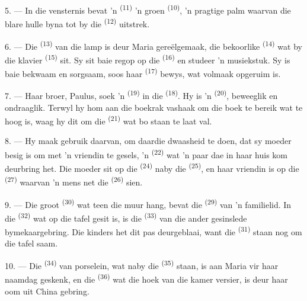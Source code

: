 5. --- In die vensternis bevat 'n  \textsuperscript{(11)} 'n groen
 \textsuperscript{(10)}, 'n pragtige palm waarvan die blare hulle byna tot
by die  \textsuperscript{(12)} uitstrek.

6. --- Die  \textsuperscript{(13)} van die lamp is deur Maria
gereëlgemaak, die bekoorlike  \textsuperscript{(14)} wat by die
klavier \textsuperscript{(15)} sit. Sy sit baie regop op die 
\textsuperscript{(16)} en studeer 'n musiekstuk. Sy is baie bekwaam en sorgsaam, soos
haar  \textsuperscript{(17)} bewys, wat volmaak opgeruim is.

\VUsaut{5.0mm}
\VUsaut{3.0mm}

7. --- Haar broer, Paulus, soek 'n  \textsuperscript{(19)} in die
 \textsuperscript{(18)}. Hy is 'n 
\textsuperscript{(20)}, beweeglik en ondraaglik. Terwyl hy hom aan die boekrak vashaak om
die boek te bereik wat te hoog is, waag hy dit om die 
\textsuperscript{(21)} wat bo staan te laat val.

8. --- Hy maak gebruik daarvan, om daardie dwaasheid te doen, dat sy moeder besig is om
met 'n vriendin te gesels, 'n  \textsuperscript{(22)} wat 'n paar dae in
haar huis kom deurbring het. Die moeder sit op die 
\textsuperscript{(24)} naby die  \textsuperscript{(25)}, en haar
vriendin is op die  \textsuperscript{(27)} waarvan 'n mens net die
 \textsuperscript{(26)} sien.

9. --- Die groot  \textsuperscript{(30)} wat teen die muur hang, bevat die
 \textsuperscript{(29)} van 'n familielid. In die 
\textsuperscript{(32)} wat op die tafel gesit is, is die 
\textsuperscript{(33)} van die ander gesinslede bymekaargebring. Die kinders het dit pas
deurgeblaai, want die  \textsuperscript{(31)} staan nog om die tafel
saam.

10. --- Die  \textsuperscript{(34)} van porselein, wat naby die
 \textsuperscript{(35)} staan, is aan Maria vir haar naamdag geskenk,
en die  \textsuperscript{(36)} wat die hoek van die kamer versier, is deur
haar oom uit China gebring.

